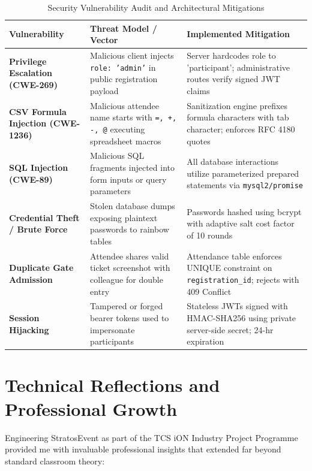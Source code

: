 \documentclass[11pt,a4paper]{report}
\begin{document}
\begin{table}[H]
\centering
\fontsize{8.5}{11.5}\selectfont
\renewcommand{\arraystretch}{1.35}
\setlength{\tabcolsep}{5pt}
\caption{Security Vulnerability Audit and Architectural Mitigations}
\label{tab:security_audits}
\begin{tabularx}{\textwidth}{|p{}|p{}|X|}
\hline
\rowcolor{TCSBlue}
\color{white}\bfseries Vulnerability & 
\color{white}\bfseries Threat Model / Vector & 
\color{white}\bfseries Implemented Mitigation \\\hline

\textbf{Privilege Escalation (CWE-269)} & Malicious client injects \texttt{role: 'admin'} in public registration payload & Server hardcodes role to 'participant'; administrative routes verify signed JWT claims \\\hline

\textbf{CSV Formula Injection (CWE-1236)} & Malicious attendee name starts with \texttt{=, +, -, @} executing spreadsheet macros & Sanitization engine prefixes formula characters with tab character; enforces RFC 4180 quotes \\\hline

\textbf{SQL Injection (CWE-89)} & Malicious SQL fragments injected into form inputs or query parameters & All database interactions utilize parameterized prepared statements via \texttt{mysql2/promise} \\\hline

\textbf{Credential Theft / Brute Force} & Stolen database dumps exposing plaintext passwords to rainbow tables & Passwords hashed using bcrypt with adaptive salt cost factor of 10 rounds \\\hline

\textbf{Duplicate Gate Admission} & Attendee shares valid ticket screenshot with colleague for double entry & Attendance table enforces UNIQUE constraint on \texttt{registration\_id}; rejects with 409 Conflict \\\hline

\textbf{Session Hijacking} & Tampered or forged bearer tokens used to impersonate participants & Stateless JWTs signed with HMAC-SHA256 using private server-side secret; 24-hr expiration \\\hline
\end{tabularx}
\end{table}

\section{Technical Reflections and Professional Growth}
\justifying
Engineering StratosEvent as part of the TCS iON Industry Project Programme provided me with invaluable professional insights that extended far beyond standard classroom theory:
\end{document}
